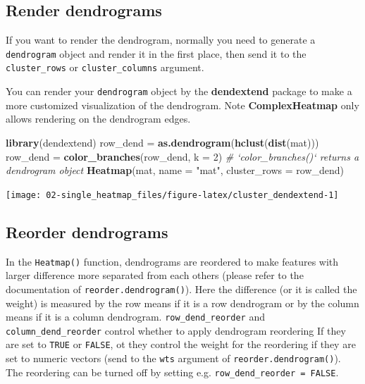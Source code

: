 \documentclass[]{book}
\newenvironment{Shaded}{\begin{snugshade}}{\end{snugshade}}
\newcommand{\KeywordTok}[1]{\textcolor[rgb]{0.13,0.29,0.53}{\textbf{#1}}}
\newcommand{\DataTypeTok}[1]{\textcolor[rgb]{0.13,0.29,0.53}{#1}}
\newcommand{\DecValTok}[1]{\textcolor[rgb]{0.00,0.00,0.81}{#1}}
\newcommand{\StringTok}[1]{\textcolor[rgb]{0.31,0.60,0.02}{#1}}
\newcommand{\CommentTok}[1]{\textcolor[rgb]{0.56,0.35,0.01}{\textit{#1}}}
\newcommand{\NormalTok}[1]{#1}
\theoremstyle{definition}
\theoremstyle{definition}
\theoremstyle{definition}
\theoremstyle{remark}
\begin{document}
\subsection{Render dendrograms}\label{render-dendrograms}

If you want to render the dendrogram, normally you need to generate a
\texttt{dendrogram} object and render it in the first place, then send
it to the \texttt{cluster\_rows} or \texttt{cluster\_columns} argument.

You can render your \texttt{dendrogram} object by the
\textbf{dendextend} package to make a more customized visualization of
the dendrogram. Note \textbf{ComplexHeatmap} only allows rendering on
the dendrogram edges.

\begin{Shaded}
\begin{Highlighting}[]
\KeywordTok{library}\NormalTok{(dendextend)}
\NormalTok{row_dend =}\StringTok{ }\KeywordTok{as.dendrogram}\NormalTok{(}\KeywordTok{hclust}\NormalTok{(}\KeywordTok{dist}\NormalTok{(mat)))}
\NormalTok{row_dend =}\StringTok{ }\KeywordTok{color_branches}\NormalTok{(row_dend, }\DataTypeTok{k =} \DecValTok{2}\NormalTok{) }\CommentTok{# `color_branches()` returns a dendrogram object}
\KeywordTok{Heatmap}\NormalTok{(mat, }\DataTypeTok{name =} \StringTok{"mat"}\NormalTok{, }\DataTypeTok{cluster_rows =}\NormalTok{ row_dend)}
\end{Highlighting}
\end{Shaded}

\begin{center}\texttt{[image: 02-single\_heatmap\_files/figure-latex/cluster\_dendextend-1]} \end{center}

\subsection{Reorder dendrograms}\label{reorder-dendrograms}

In the \texttt{Heatmap()} function, dendrograms are reordered to make
features with larger difference more separated from each others (please
refer to the documentation of \texttt{reorder.dendrogram()}). Here the
difference (or it is called the weight) is measured by the row means if
it is a row dendrogram or by the column means if it is a column
dendrogram. \texttt{row\_dend\_reorder} and
\texttt{column\_dend\_reorder} control whether to apply dendrogram
reordering If they are set to \texttt{TRUE} or \texttt{FALSE}, ot they
control the weight for the reordering if they are set to numeric vectors
(send to the \texttt{wts} argument of \texttt{reorder.dendrogram()}).
The reordering can be turned off by setting e.g.
\texttt{row\_dend\_reorder\ =\ FALSE}.
\end{document}

